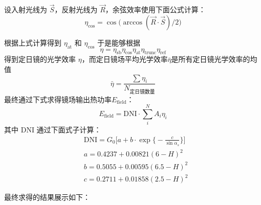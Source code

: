 \documentclass[../main.tex]{subfiles}
\begin{document}
设入射光线为 \(\vec S\)，反射光线为 \(\vec R\)，余弦效率使用下面公式计算：
\begin{equation}
\eta _{\cos} = \cos \big(\arccos (\vec R \cdot \vec S) / 2\big)
\end{equation}

根据上式计算得到 \(\eta _{\mathrm{at}}\) 和 \(\eta _{\cos}\)
于是能够根据
\begin{equation}
\eta = \eta _{\mathrm{s b}} \eta _{\cos} \eta _{\mathrm{at}} \eta _{\mathrm{trunc}} \eta _{\mathrm{ref}}
\end{equation}
得到定日镜的光学效率 \(\eta\)，而定日镜场平均光学效率\(\bar \eta\)是所有定日镜光学效率的均值
\begin{equation}
\bar \eta = \frac{\sum \eta_{i}}{N_{\text{定日镜数量}}}
\end{equation}
最终通过下式求得镜场输出热功率\(E_{\mathrm{field}}\)：
\begin{equation}
E_{\mathrm{field}} = \mathrm{DNI} \cdot \sum _{i} ^{N} A_{i} \eta _{i}
\end{equation}
其中 \(\mathrm{DNI}\) 通过下面式子计算：
\begin{equation}
\begin{aligned}
& \mathrm{DNI} = G_{0} \bigg[ a + b \cdot \exp\Big\{{-}\frac{c}{\sin \alpha_{s}}\Big\}\bigg]\\
& a = 0.4237 + 0.00821 (6 - H) ^{2} \\
& b = 0.5055 + 0.00595(6.5 - H) ^{2} \\
& c = 0.2711 + 0.01858 (2.5 - H) ^{2}
\end{aligned}
\end{equation}

最终求得的结果展示如下：

\end{document}

